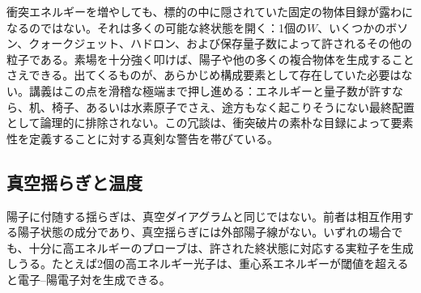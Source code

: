 衝突エネルギーを増やしても、標的の中に隠されていた固定の物体目録が露わになるのではない。それは多くの可能な終状態を開く：1個の\(W\)、いくつかのボソン、クォークジェット、ハドロン、および保存量子数によって許されるその他の粒子である。素場を十分強く叩けば、陽子や他の多くの複合物体を生成することさえできる。出てくるものが、あらかじめ構成要素として存在していた必要はない。講義はこの点を滑稽な極端まで押し進める：エネルギーと量子数が許すなら、机、椅子、あるいは水素原子でさえ、途方もなく起こりそうにない最終配置として論理的に排除されない。この冗談は、衝突破片の素朴な目録によって要素性を定義することに対する真剣な警告を帯びている。

\subsection{真空揺らぎと温度}

陽子に付随する揺らぎは、真空ダイアグラムと同じではない。前者は相互作用する陽子状態の成分であり、真空揺らぎには外部陽子線がない。いずれの場合でも、十分に高エネルギーのプローブは、許された終状態に対応する実粒子を生成しうる。たとえば2個の高エネルギー光子は、重心系エネルギーが閾値を超えると電子--陽電子対を生成できる。

\begin{classroomqa}
\end{classroomqa}

\begin{classroomqa}
\end{classroomqa}

\begin{classroomqa}
\end{classroomqa}

